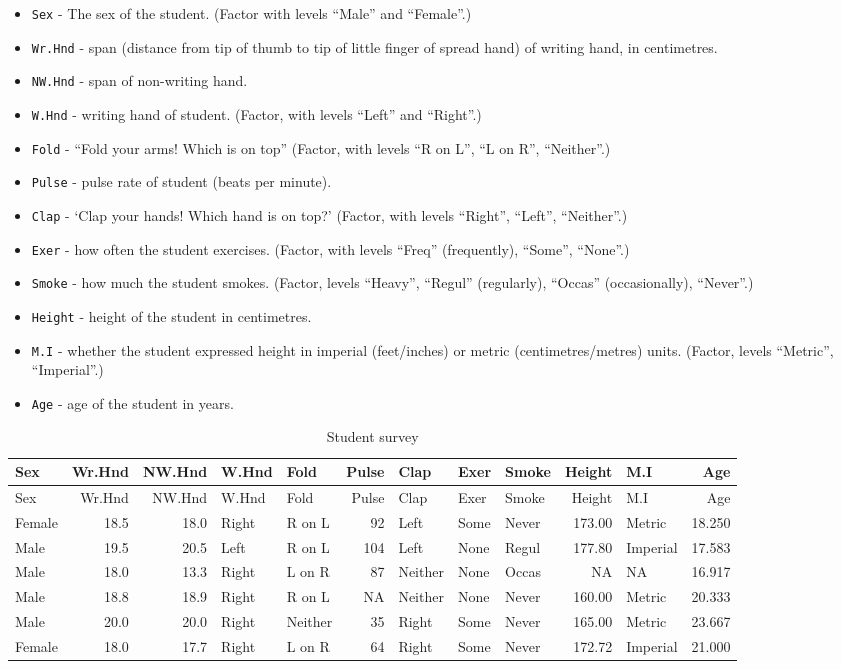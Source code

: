 \documentclass[
]{book}
\providecommand{\tightlist}{%
  \setlength{\itemsep}{0pt}\setlength{\parskip}{0pt}}
\begin{document}
\begin{itemize}
\tightlist
\item
  \texttt{Sex} - The sex of the student. (Factor with levels ``Male'' and ``Female''.)
\item
  \texttt{Wr.Hnd} - span (distance from tip of thumb to tip of little finger of spread hand) of writing hand, in centimetres.
\item
  \texttt{NW.Hnd} - span of non-writing hand.
\item
  \texttt{W.Hnd} - writing hand of student. (Factor, with levels ``Left'' and ``Right''.)
\item
  \texttt{Fold} - ``Fold your arms! Which is on top'' (Factor, with levels ``R on L'', ``L on R'', ``Neither''.)
\item
  \texttt{Pulse} - pulse rate of student (beats per minute).
\item
  \texttt{Clap} - `Clap your hands! Which hand is on top?' (Factor, with levels ``Right'', ``Left'', ``Neither''.)
\item
  \texttt{Exer} - how often the student exercises. (Factor, with levels ``Freq'' (frequently), ``Some'', ``None''.)
\item
  \texttt{Smoke} - how much the student smokes. (Factor, levels ``Heavy'', ``Regul'' (regularly), ``Occas'' (occasionally), ``Never''.)
\item
  \texttt{Height} - height of the student in centimetres.
\item
  \texttt{M.I} - whether the student expressed height in imperial (feet/inches) or metric (centimetres/metres) units. (Factor, levels ``Metric'', ``Imperial''.)
\item
  \texttt{Age} - age of the student in years.
\end{itemize}

\begin{longtable}[]{@{}lrrllrlllrlr@{}}
\caption{\label{tab:unnamed-chunk-3}Student survey}\tabularnewline
\toprule
Sex & Wr.Hnd & NW.Hnd & W.Hnd & Fold & Pulse & Clap & Exer & Smoke & Height & M.I & Age\tabularnewline
\midrule
\endfirsthead
\toprule
Sex & Wr.Hnd & NW.Hnd & W.Hnd & Fold & Pulse & Clap & Exer & Smoke & Height & M.I & Age\tabularnewline
\midrule
\endhead
Female & 18.5 & 18.0 & Right & R on L & 92 & Left & Some & Never & 173.00 & Metric & 18.250\tabularnewline
Male & 19.5 & 20.5 & Left & R on L & 104 & Left & None & Regul & 177.80 & Imperial & 17.583\tabularnewline
Male & 18.0 & 13.3 & Right & L on R & 87 & Neither & None & Occas & NA & NA & 16.917\tabularnewline
Male & 18.8 & 18.9 & Right & R on L & NA & Neither & None & Never & 160.00 & Metric & 20.333\tabularnewline
Male & 20.0 & 20.0 & Right & Neither & 35 & Right & Some & Never & 165.00 & Metric & 23.667\tabularnewline
Female & 18.0 & 17.7 & Right & L on R & 64 & Right & Some & Never & 172.72 & Imperial & 21.000\tabularnewline
\bottomrule
\end{longtable}
\end{document}
